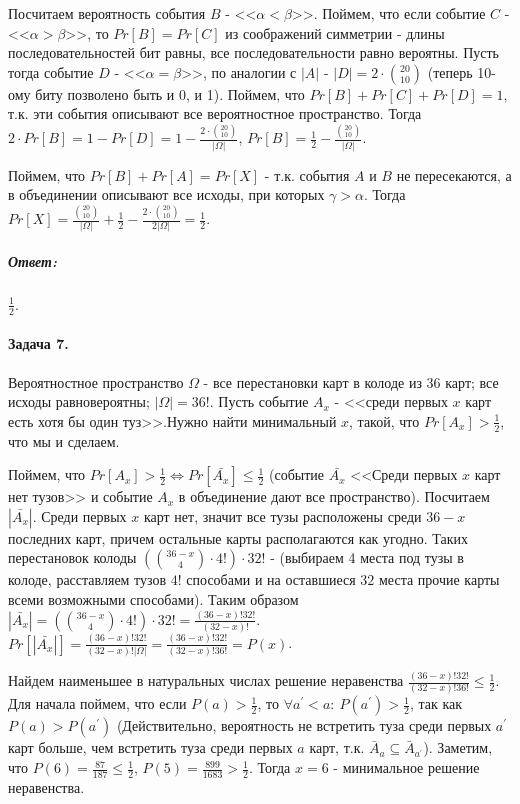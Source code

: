 \documentclass{article}
\newcommand{\pr}{^{\prime}}
\begin{document}
	Посчитаем вероятность события $B$ - <<$\alpha < \beta$>>. Поймем, что если событие $C$ - <<$\alpha > \beta$>>, то $Pr[B] = Pr[C]$ из соображений симметрии - длины последовательностей бит равны, все последовательности равно вероятны. Пусть тогда  событие $D$ - <<$\alpha = \beta$>>, по аналогии с $|A|$ - $|D| = 2\cdot{20 \choose 10}$ (теперь 10-ому биту позволено быть и 0, и 1). Поймем, что $Pr[B] + Pr[C] + Pr[D] = 1$, т.к. эти события описывают все вероятностное пространство. Тогда $2 \cdot Pr[B] = 1 - Pr[D] = 1 - \frac{2 \cdot {20 \choose 10}}{|\Omega|}$, $Pr[B] = \frac{1}{2} - \frac{{20 \choose 10}}{|\Omega|}$.
	
	Поймем, что $Pr[B] + Pr[A] = Pr[X]$ - т.к. события $A$ и $B$ не пересекаются, а в объединении описывают все исходы, при которых $\gamma > \alpha$. Тогда $Pr[X] = \frac{{20 \choose 10}}{|\Omega|} + \frac{1}{2} - \frac{2 \cdot {20 \choose 10}}{2|\Omega|} = \frac{1}{2}$.
	
	\subparagraph{Ответ:} $\frac{1}{2}$.
	
	\paragraph{Задача 7.}
	Вероятностное пространство $\Omega$ - все перестановки карт в колоде из 36 карт; все исходы равновероятны; $|\Omega| = 36!$. Пусть событие $A_x$ - <<среди первых $x$ карт есть хотя бы один туз>>.Нужно найти минимальный $x$, такой, что $Pr[A_x] > \frac{1}{2}$, что мы и сделаем.
	
	Поймем, что $Pr[A_x] > \frac{1}{2} \Leftrightarrow Pr[\bar{A_x}] \leqslant \frac{1}{2}$ (событие $\bar{A_x}$ <<Среди первых $x$ карт нет тузов>> и событие $A_x$ в объединение дают все пространство). Посчитаем $|\bar{A_x}|$. Среди первых $x$ карт нет, значит все тузы расположены среди $36 - x$ последних карт, причем остальные карты располагаются как угодно. Таких перестановок колоды $({36 - x \choose 4} \cdot 4!) \cdot 32!$ - (выбираем 4 места под тузы в колоде, расставляем тузов $4!$ способами и на оставшиеся $32$ места прочие карты всеми возможными способами). Таким образом $|\bar{A_x}| = ({36 - x \choose 4} \cdot 4!) \cdot 32! = \frac{(36 - x)!32!}{(32 - x)!}$. $Pr[|\bar{A_x}|] = \frac{(36 - x)!32!}{(32 - x)!|\Omega|} = \frac{(36 - x)!32!}{(32 - x)!36!} = P(x)$.
	
	Найдем наименьшее в натуральных числах решение \linebreak неравенства $\frac{(36 - x)!32!}{(32 - x)!36!} \leqslant \frac{1}{2}$. Для начала поймем, что если $P(a) > \frac{1}{2}$, то $\forall a\pr < a:\ P(a\pr) > \frac{1}{2}$, так как $P(a) > P(a\pr)$ (Действительно, вероятность не встретить туза среди первых $a\pr$ карт больше, чем встретить туза среди первых $a$ карт, т.к. $\bar{A}_a \subseteq \bar{A}_{a\pr} $). Заметим, что $P(6) = \frac{87}{187} \leqslant \frac{1}{2}$, $P(5) = \frac{899}{1683} > \frac{1}{2}$. Тогда $x = 6$ - минимальное решение неравенства.
	
\end{document}
